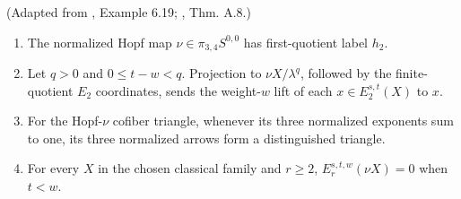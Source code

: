 \begin{theorem}
\label{frontier:Literature:0385573fba72}
(Adapted from \cite{LWX126}, Example 6.19; \cite{BHS}, Thm. A.8.)\par{}

\begin{enumerate}
\item The normalized Hopf map $\nu\in\pi_{3,4}S^{0,0}$ has first-quotient label $h_2$.
\item Let $q>0$ and $0\le t-w<q$. Projection to $\nu X/\lambda^q$, followed by the finite-quotient $E_2$ coordinates, sends the weight-$w$ lift of each $x\in E_2^{s,t}(X)$ to $x$.
\item For the Hopf-$\nu$ cofiber triangle, whenever its three normalized exponents sum to one, its three normalized arrows form a distinguished triangle.
\item For every $X$ in the chosen classical family and $r\ge2$, $E_r^{s,t,w}(\nu X)=0$ when $t<w$.
\end{enumerate}
\end{theorem}

